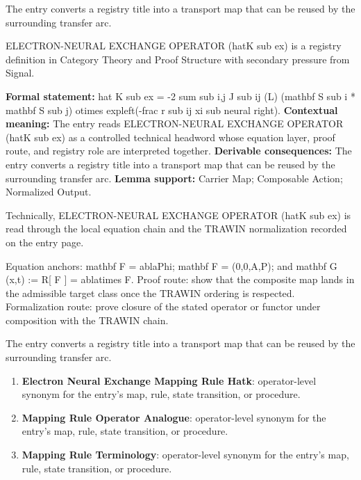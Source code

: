 The entry converts a registry title into a transport map that can be reused by the surrounding transfer arc.
\clearpage


\begingroup\small
{}
ELECTRON-NEURAL EXCHANGE OPERATOR (hatK sub ex) is a registry definition in Category Theory and Proof Structure with secondary pressure from Signal.

\begingroup\footnotesize\setlength{\emergencystretch}{3em}\sloppy
\textbf{Formal statement:} hat K sub ex = -2 sum sub i,j J sub ij (L) (mathbf S sub i * mathbf S sub j) otimes expleft(-frac r sub ij xi sub neural right). \textbf{Contextual meaning:} The entry reads ELECTRON-NEURAL EXCHANGE OPERATOR (hatK sub ex) as a controlled technical headword whose equation layer, proof route, and registry role are interpreted together. \textbf{Derivable consequences:} The entry converts a registry title into a transport map that can be reused by the surrounding transfer arc. \textbf{Lemma support:} Carrier Map; Composable Action; Normalized Output.\par
\endgroup

Technically, ELECTRON-NEURAL EXCHANGE OPERATOR (hatK sub ex) is read through the local equation chain and the TRAWIN normalization recorded on the entry page.

Equation anchors: mathbf F = ablaPhi; mathbf F = (0,0,A,P); and mathbf G (x,t) := R[ F ] = ablatimes F. Proof route: show that the composite map lands in the admissible target class once the TRAWIN ordering is respected. Formalization route: prove closure of the stated operator or functor under composition with the TRAWIN chain.

The entry converts a registry title into a transport map that can be reused by the surrounding transfer arc.
\endgroup

\begin{enumerate}[leftmargin=1.6em,itemsep=6pt,topsep=4pt]
\item \textbf{Electron Neural Exchange Mapping Rule Hatk}: operator-level synonym for the entry's map, rule, state transition, or procedure.
\item \textbf{Mapping Rule Operator Analogue}: operator-level synonym for the entry's map, rule, state transition, or procedure.
\item \textbf{Mapping Rule Terminology}: operator-level synonym for the entry's map, rule, state transition, or procedure.
\end{enumerate}


